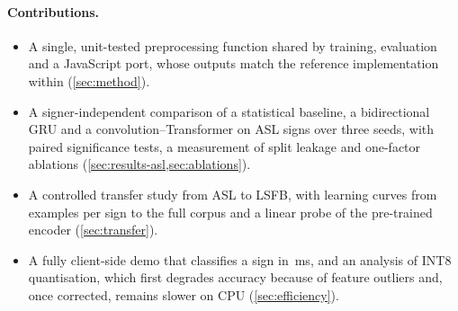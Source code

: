 \paragraph{Contributions.}
\begin{itemize}
  \item A single, unit-tested preprocessing function shared by training, evaluation and a
        JavaScript port, whose outputs match the reference implementation within \numJsParity{}
        (\cref{sec:method}).
  \item A signer-independent comparison of a statistical baseline, a bidirectional GRU and a
        convolution--Transformer on \numAslClasses{} ASL signs over three seeds, with paired
        significance tests, a measurement of split leakage and one-factor ablations
        (\cref{sec:results-asl,sec:ablations}).
  \item A controlled transfer study from ASL to LSFB, with learning curves from \numLcMin{}
        examples per sign to the full corpus and a linear probe of the pre-trained encoder
        (\cref{sec:transfer}).
  \item A fully client-side demo that classifies a sign in \numFpBrowser{}\,ms, and an analysis
        of INT8 quantisation, which first degrades accuracy because of feature outliers and,
        once corrected, remains slower on CPU (\cref{sec:efficiency}).
\end{itemize}

